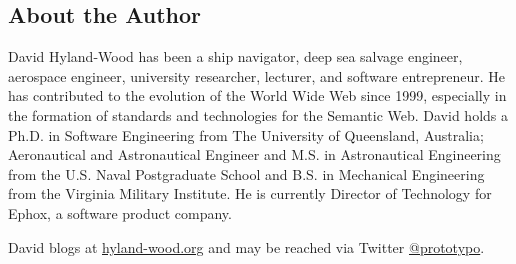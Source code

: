% 
% 

\vspace*{\fill}
\begin{center}
\section*{\textbf{About the Author}}
\end{center}

David Hyland-Wood has been a ship navigator, deep sea salvage engineer, aerospace engineer, university researcher, lecturer, and software entrepreneur. He has contributed to the evolution of the World Wide Web since 1999, especially in the formation of standards and technologies for the Semantic Web. David holds a Ph.D. in Software Engineering from The University of Queensland, Australia; Aeronautical and Astronautical Engineer and M.S. in Astronautical Engineering from the U.S. Naval Postgraduate School and B.S. in Mechanical Engineering from the Virginia Military Institute. He is currently Director of Technology for Ephox, a software product company.

David blogs at \href{hyland-wood.org}{hyland-wood.org} and may be reached via Twitter \href{https://twitter.com/prototypo}{@prototypo}.
\vspace*{\fill}
